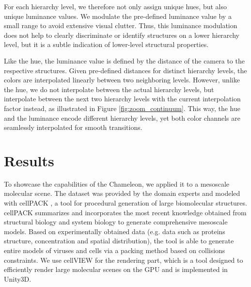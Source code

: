 \documentclass[review,journal]{vgtc}         %
\begin{document}
	
	For each hierarchy level, we therefore not only assign unique hues, but also unique luminance values. 
	We modulate the pre-defined luminance value by a small range to avoid extensive visual clutter. 
	Thus, this luminance modulation does not help to clearly discriminate or identify structures on a lower hierarchy level, but it is a subtle indication of lower-level structural properties. 
	
	Like the hue, the luminance value is defined by the distance of the camera to the respective structures. 
	Given pre-defined distances for distinct hierarchy levels, the colors are interpolated linearly between two neighboring levels. 
	However, unlike the hue, we do not interpolate between the actual hierarchy levels, but interpolate between the next two hierarchy levels with the current interpolation factor instead, as illustrated in Figure \ref{fig:zoom_continuum}. 
	This way, the hue and the luminance encode different hierarchy levels, yet both color channels are seamlessly interpolated for smooth transitions. 
		
	\section{Results}
	\label{sec:results}
	
	To showcase the capabilities of the Chameleon, we applied it to a mesoscale molecular scene. 
	The dataset was provided by the domain experts and modeled with cellPACK \cite{johnson2015cellpack}, a tool for procedural generation of large biomolecular structures.
	cellPACK summarizes and incorporates the most recent knowledge obtained from structural biology and system biology to generate comprehensive mesoscale models. 
	Based on experimentally obtained data (e.g. data such as proteins structure, concentration and spatial distribution), the tool is able to generate entire models of viruses and cells via a packing method based on collisions constraints.
	We use cellVIEW \cite{muzic2015cellview} for the rendering part, which is a tool designed to efficiently render large molecular scenes on the GPU and is implemented in Unity3D. \\
	
\end{document}
